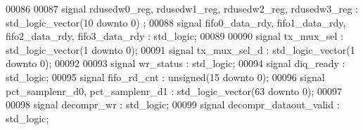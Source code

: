 \begin{DoxyCode}
00086   
00087   \textcolor{keywordflow}{signal} \textcolor{vhdlchar}{rdusedw0_reg}\textcolor{vhdlchar}{,} \textcolor{vhdlchar}{rdusedw1_reg}\textcolor{vhdlchar}{,} \textcolor{vhdlchar}{rdusedw2_reg}\textcolor{vhdlchar}{,} \textcolor{vhdlchar}{rdusedw3_reg}             \textcolor{vhdlchar}{:} \textcolor{comment}{std\_logic\_vector}\textcolor{vhdlchar}{(}\textcolor{vhdllogic}{}\textcolor{vhdllogic}{10} \textcolor{keywordflow}{downto} \textcolor{vhdllogic}{}\textcolor{vhdllogic}{0}\textcolor{vhdlchar}{)}
      ;
00088   \textcolor{keywordflow}{signal} \textcolor{vhdlchar}{fifo0_data_rdy}\textcolor{vhdlchar}{,} \textcolor{vhdlchar}{fifo1_data_rdy}\textcolor{vhdlchar}{,} \textcolor{vhdlchar}{fifo2_data_rdy}\textcolor{vhdlchar}{,} \textcolor{vhdlchar}{fifo3_data_rdy} \textcolor{vhdlchar}{:} \textcolor{comment}{std\_logic};
00089   
00090   \textcolor{keywordflow}{signal} \textcolor{vhdlchar}{tx_mux_sel}     \textcolor{vhdlchar}{:} \textcolor{comment}{std\_logic\_vector}\textcolor{vhdlchar}{(}\textcolor{vhdllogic}{}\textcolor{vhdllogic}{1} \textcolor{keywordflow}{downto} \textcolor{vhdllogic}{}\textcolor{vhdllogic}{0}\textcolor{vhdlchar}{)};
00091   \textcolor{keywordflow}{signal} \textcolor{vhdlchar}{tx_mux_sel_d}   \textcolor{vhdlchar}{:} \textcolor{comment}{std\_logic\_vector}\textcolor{vhdlchar}{(}\textcolor{vhdllogic}{}\textcolor{vhdllogic}{1} \textcolor{keywordflow}{downto} \textcolor{vhdllogic}{}\textcolor{vhdllogic}{0}\textcolor{vhdlchar}{)}; 
00092   
00093   \textcolor{keywordflow}{signal} \textcolor{vhdlchar}{wr_status}      \textcolor{vhdlchar}{:} \textcolor{comment}{std\_logic};
00094   \textcolor{keywordflow}{signal} \textcolor{vhdlchar}{diq_ready}          \textcolor{vhdlchar}{:} \textcolor{comment}{std\_logic};
00095   \textcolor{keywordflow}{signal} \textcolor{vhdlchar}{fifo_rd_cnt}    \textcolor{vhdlchar}{:} \textcolor{comment}{unsigned}\textcolor{vhdlchar}{(}\textcolor{vhdllogic}{}\textcolor{vhdllogic}{15} \textcolor{keywordflow}{downto} \textcolor{vhdllogic}{}\textcolor{vhdllogic}{0}\textcolor{vhdlchar}{)};
00096   \textcolor{keywordflow}{signal} \textcolor{vhdlchar}{pct_samplenr_d0}\textcolor{vhdlchar}{,}  \textcolor{vhdlchar}{pct_samplenr_d1} \textcolor{vhdlchar}{:} \textcolor{comment}{std\_logic\_vector}\textcolor{vhdlchar}{(}\textcolor{vhdllogic}{}\textcolor{vhdllogic}{63} \textcolor{keywordflow}{downto} \textcolor{vhdllogic}{}\textcolor{vhdllogic}{0}\textcolor{vhdlchar}{)};
00097   
00098   \textcolor{keywordflow}{signal} \textcolor{vhdlchar}{decompr_wr}                     \textcolor{vhdlchar}{:} \textcolor{comment}{std\_logic};
00099   \textcolor{keywordflow}{signal} \textcolor{vhdlchar}{decompr_dataout_valid}  \textcolor{vhdlchar}{:} \textcolor{comment}{std\_logic};

\end{DoxyCode}
